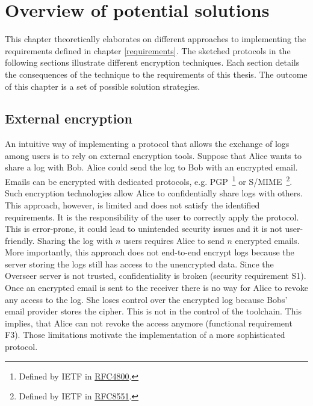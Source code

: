 \documentclass[../main.tex]{subfiles}
\begin{document}
\chapter{Overview of potential solutions}

This chapter theoretically elaborates on different approaches to implementing the requirements defined in chapter \ref{requirements}.
The sketched protocols in the following sections illustrate different encryption techniques.
Each section details the consequences of the technique to the requirements of this thesis.
The outcome of this chapter is a set of possible solution strategies.

\section{External encryption}
\label{sec:external-encryption}
An intuitive way of implementing a protocol that allows the exchange of logs among users is to rely on external encryption tools.
Suppose that Alice wants to share a log with Bob.
Alice could send the log to Bob with an encrypted email.
Emails can be encrypted with dedicated protocols, e.g. PGP~\footnote{Defined by IETF in \href{https://www.rfc-editor.org/rfc/rfc4880}{RFC4800}.} or S/MIME~\footnote{Defined by IETF in \href{https://www.rfc-editor.org/rfc/rfc8551.html}{RFC8551}.}.
Such encryption technologies allow Alice to confidentially share logs with others.
This approach, however, is limited and does not satisfy the identified requirements.
It is the responsibility of the user to correctly apply the protocol.
This is error-prone, it could lead to unintended security issues and it is not user-friendly.
Sharing the log with $n$ users requires Alice to send $n$ encrypted emails.
More importantly, this approach does not end-to-end encrypt logs because the server storing the logs still has access to the unencrypted data.
Since the Overseer server is not trusted, confidentiality is broken (security requirement S1).
Once an encrypted email is sent to the receiver there is no way for Alice to revoke any access to the log.
She loses control over the encrypted log because Bobs' email provider stores the cipher.
This is not in the control of the toolchain.
This implies, that Alice can not revoke the access anymore (functional requirement F3).
Those limitations motivate the implementation of a more sophisticated protocol.
\end{document}
